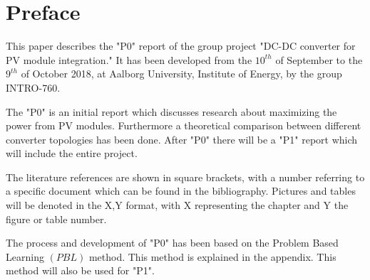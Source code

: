 \chapter*{Preface}

This paper describes the "P0" report of the group project "DC-DC converter for PV module integration." It has been developed from the $10^{th}$ of September to the $9^{th}$ of October 2018, at Aalborg University, Institute of Energy, by the group INTRO-760.

The "P0" is an initial report which discusses research about maximizing the power from PV modules.
Furthermore a theoretical comparison between different converter topologies has been done. After "P0" there will be a "P1" report which will include the entire project.

The literature references are shown in square brackets, with a number referring to a specific document which can be found in the bibliography. Pictures and tables will be denoted in the X,Y format, with X representing the chapter and Y the figure or table number. 

The process and development of "P0" has been based on the Problem Based Learning $(PBL)$ method. This method is explained in the appendix. This method will also be used for "P1".
